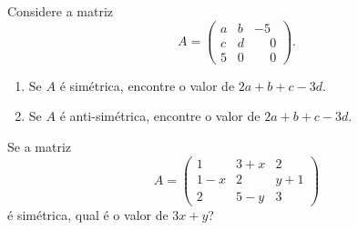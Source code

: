 \documentclass[12pt]{exam}
\begin{document}
    \vspace{.3cm}

    \questao{}Considere a matriz
        \[
            A = \begin{pmatrix}a & b & -5\\c & d & \phantom{-} 0\\5 & 0 & \phantom{-} 0\end{pmatrix}.
        \]
        \begin{enumerate}[label={\alph*})]
            \item Se $A$ é simétrica, encontre o valor de $2a + b + c - 3d$.
            \item Se $A$ é anti-simétrica, encontre o valor de $2a + b + c - 3d$.
        \end{enumerate}

    \vspace{.3cm}

    \questao{}Se a matriz
        \[
            A = \begin{pmatrix}1 & 3 + x & 2\\1 - x & 2 & y + 1\\2 & 5 - y & 3\end{pmatrix}
        \]
        é simétrica, qual é o valor de $3x + y$?
\end{document}
